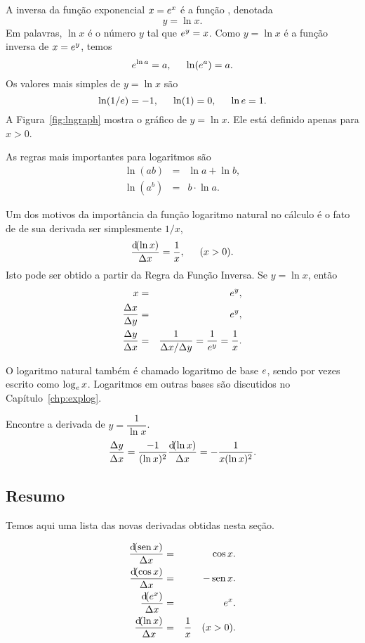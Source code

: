 A inversa da função exponencial $x = e^x$ é a função
, denotada
$$
  y = \ln x.
$$
Em palavras, $\ln x$ é o número $y$ tal que $e^y = x$. Como $y = \ln x$
é a função inversa de $x = e^y$, temos
$$
  e^{\ln a} = a, \hspace{1.5em} \ln(e^a) = a.
$$
Os valores mais simples de $y = \ln x$ são
$$
  \ln(1/e) = -1, \hspace{1.5em} \ln(1) = 0, \hspace{1.5em} \ln e = 1.
$$
A Figura~\ref{fig:lngraph} mostra o gráfico de $y = \ln x$. Ele está
definido apenas para $x > 0$.


As regras mais importantes para logaritmos são
\begin{eqnarray*}
  \ln(ab) & = & \ln a + \ln b, \\
  \ln(a^b) & = & b \cdot \ln a.
\end{eqnarray*}

Um dos motivos da importância da função logaritmo natural no cálculo é
o fato de de sua derivada ser simplesmente $1/x$,
$$
  \frac{\dif(\ln x)}{\dx} = \frac{1}{x}, \hspace{1.5em} (x > 0).
$$
Isto pode ser obtido a partir da Regra da Função Inversa.
Se $y =  \ln x$, então
\begin{eqnarray*}
  x & = & e^y, \\
  \frac{\Delta{x}}{\Delta{y}} & = & e^y, \\
  \frac{\Delta{y}}{\Delta{x}} & = & \frac{1}{\Delta{x}/\Delta{y}} = \frac{1}{e^y} = \frac{1}{x}.
\end{eqnarray*}

O logaritmo natural também é chamado logaritmo de base $e$, sendo por
vezes escrito como $\log_{e} x$. Logaritmos em outras bases são discutidos
no Capítulo~\ref{chp:explog}.

\begin{example} Encontre a derivada de $y = \dfrac{1}{\ln x}$.
$$
  \frac{\dy}{\dx} = \frac{-1}{(\ln x)^2} \frac{\dif(\ln x)}{\dx} = 
    -\frac{1}{x (\ln x)^2}.
$$
\end{example}

\subsection{Resumo}

Temos aqui uma lista das novas derivadas obtidas nesta seção.

\begin{eqnarray*}
  \frac{\dif(\sen x)}{\dx} & = & \cos x. \\
  \frac{\dif(\cos x)}{\dx} & = & -\sen x. \\
  \frac{\dif(\e^x)}{\dx} & = & \e^x. \\
  \frac{\dif(\ln x)}{\dx} & = & \frac{1}{x} \hspace{1em} (x > 0).
\end{eqnarray*}

